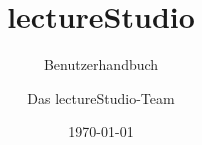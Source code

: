\usepackage[ngerman]{babel}
\usepackage[babel]{csquotes}
\usepackage{longtable}
\usepackage{makecell}
\usepackage{fontawesome}
\usepackage{menukeys}

\hypersetup{
	colorlinks	= true,
	urlcolor	= blue,
	linkcolor	= blue,
	citecolor	= red
}

\setlength{\abovecaptionskip}{1em}

\renewcommand{\cellalign}{l}
\renewcommand{\quote}[1]{``#1''}

\newcommand{\lectStudio}{{lectureStudio}}
\newcommand{\lectPresenter}{{lecturePresenter}}
\newcommand{\lectEditor}{{lectureEditor}}

\title{lectureStudio}
\subtitle{Benutzerhandbuch}
\author{Das lectureStudio-Team}
\date{\today}

